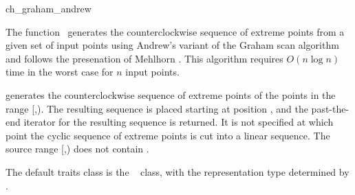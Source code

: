 
\begin{ccRefFunction}{ch_graham_andrew}  %

\ccDefinition
  
The function \ccRefName\ generates the counterclockwise sequence of extreme
points from a given set of input points using Andrew's variant of the Graham
scan algorithm \cite{a-aeach-79} and follows the presenation of Mehlhorn
\cite{m-mdscg-84}. This algorithm requires $O(n \log n)$ time 
in the worst case for $n$ input points.  


            {generates the counterclockwise sequence of extreme points
            of the points in the range [,).
            The resulting sequence is placed starting at position
            , and the past-the-end iterator for the resulting
            sequence is returned. It is not specified at which point the
            cyclic sequence of extreme points is cut into a linear sequence.
            \ccPrecond %
            The source range [,) does not contain
            .}

The default traits class  is the \cgal\
 class,%
with the representation type determined by .


\end{ccRefFunction}
